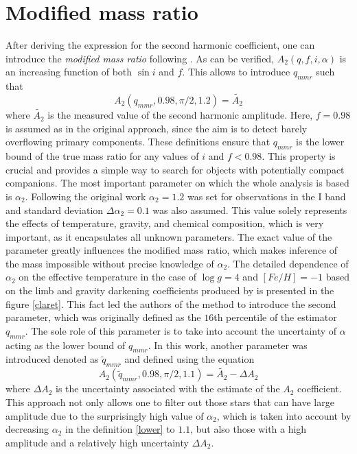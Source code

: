 \documentclass{pracalicmgr}
\begin{document}
\section{Modified mass ratio}
After deriving the expression for the second harmonic coefficient, one can introduce the {{\it modified mass ratio}} following \citet{gomel_search_2021-2}. 
As can be verified, $A_2(q,f,i,\alpha)$ is an increasing
function of both $\sin{i}$ and $f$. This allows to introduce $q_{mmr}$ such that
\begin{equation}\label{qmmr}
    A_2(q_{mmr},0.98,\pi/2,1.2)=\tilde{A_2}
\end{equation}
where $\tilde{A_2}$ is the measured value of the second harmonic amplitude.
Here, $f=0.98$ is assumed as in the original approach, since the aim is to detect barely overflowing primary components.
These definitions ensure that $q_{mmr}$ is the lower bound of the true mass ratio for any values of $i$ and $f<0.98$. 
This property is crucial and provides a simple way to search for objects with potentially compact companions.
The most important parameter on which the whole analysis is based is $\alpha_2$.
Following the original work $\alpha_2=1.2$ was set for observations in the I band and standard deviation $\Delta\alpha_2=0.1$
was also assumed. This value
solely represents the effects of temperature, gravity, and chemical composition, which is very important, as it encapsulates all unknown parameters. 
The exact value of the parameter greatly influences the modified mass ratio, which makes inference of the mass impossible without precise knowledge of $\alpha_2$.
The detailed dependence of $\alpha_2$ on the effective temperature in the case of $\log g=4$ and $[Fe/H]=-1$ based on the limb and gravity darkening coefficients produced by
\citet{claret_new_2000} is presented in the figure \ref{claret}.
This fact led the authors of the method to introduce the second parameter, which was originally defined as the $16$th percentile of the estimator $q_{mmr}$. The sole role of this
parameter is to take into account the uncertainty of $\alpha$ acting as the lower bound of $q_{mmr}$. In this work, another parameter was introduced denoted as $\tilde{q}_{mmr}$ and defined
using the equation
\begin{equation*}\label{lower}
    A_2(\tilde{q}_{mmr},0.98,\pi/2,1.1)=\tilde{A_2}-\Delta A_2
\end{equation*}
where $\Delta A_2$ is the uncertainty associated with the estimate of the $A_2$ coefficient. This approach not only allows one to filter out those stars that can have large amplitude due to
the surprisingly high value of $\alpha_2$, which is taken into account by decreasing $\alpha_2$ in the definition \ref{lower} to $1.1$, but also those with
a high amplitude and a relatively high uncertainty $\Delta A_2$.
\end{document}
